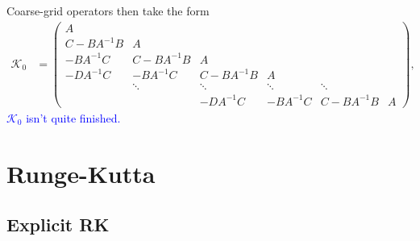 \documentclass[a4paper,12pt]{article}
\newcommand{\tcb}{\textcolor{blue}}
\begin{document}
Coarse-grid operators then take the form
%
\begin{align*}
\mathcal{K}_0 & =
\begin{pmatrix}
	A \\
	C - BA^{-1}B& A \\ 
	-BA^{-1}C & C- BA^{-1}B & A \\
	- DA^{-1}C & - BA^{-1}C & C - BA^{-1}B & A \\
	& \ddots & \ddots & \ddots & \ddots \\
	& & - DA^{-1}C & -BA^{-1}C & C - BA^{-1}B & A
\end{pmatrix},
\end{align*}
%
\tcb{$\mathcal{K}_0$ isn't quite finished.}





\newpage
\section{Runge-Kutta}\label{sec:RK}

\subsection{Explicit RK} 
\end{document}
